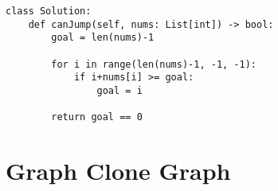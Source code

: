 \documentclass[24pt, a4]{article}
\begin{document}
\begin{lstlisting}
class Solution:
    def canJump(self, nums: List[int]) -> bool:
        goal = len(nums)-1
        
        for i in range(len(nums)-1, -1, -1):
            if i+nums[i] >= goal:
                goal = i
                
        return goal == 0
\end{lstlisting}

\section{Graph Clone Graph}
\begin{lstlisting}



\end{lstlisting}
\end{document}
